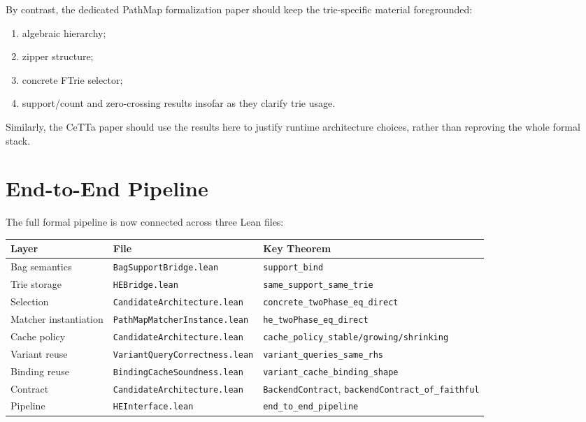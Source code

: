 \documentclass[11pt]{article}
\newcommand{\CeTTa}{\textup{CeTTa}}
\newcommand{\PathMap}{\textup{PathMap}}
\begin{document}
By contrast, the dedicated \PathMap{} formalization paper should keep the
trie-specific material foregrounded:
\begin{enumerate}
\item algebraic hierarchy;
\item zipper structure;
\item concrete FTrie selector;
\item support/count and zero-crossing results insofar as they clarify trie
  usage.
\end{enumerate}

Similarly, the \CeTTa{} paper should use the results here to justify
runtime architecture choices, rather than reproving the whole formal
stack.

\section{End-to-End Pipeline}

The full formal pipeline is now connected across three Lean files:

\begin{center}
\begin{tabular}{@{}lll@{}}
\toprule
\textbf{Layer} & \textbf{File} & \textbf{Key Theorem} \\
\midrule
Bag semantics & \texttt{BagSupportBridge.lean} & \texttt{support\_bind} \\
Trie storage  & \texttt{HEBridge.lean} & \texttt{same\_support\_same\_trie} \\
Selection     & \texttt{CandidateArchitecture.lean} & \texttt{concrete\_twoPhase\_eq\_direct} \\
Matcher instantiation & \texttt{PathMapMatcherInstance.lean} & \texttt{he\_twoPhase\_eq\_direct} \\
Cache policy  & \texttt{CandidateArchitecture.lean} & \texttt{cache\_policy\_stable/growing/shrinking} \\
Variant reuse & \texttt{VariantQueryCorrectness.lean} & \texttt{variant\_queries\_same\_rhs} \\
Binding reuse & \texttt{BindingCacheSoundness.lean} & \texttt{variant\_cache\_binding\_shape} \\
Contract      & \texttt{CandidateArchitecture.lean} & \texttt{BackendContract}, \texttt{backendContract\_of\_faithful} \\
Pipeline      & \texttt{HEInterface.lean} & \texttt{end\_to\_end\_pipeline} \\
\bottomrule
\end{tabular}
\end{center}
\end{document}
